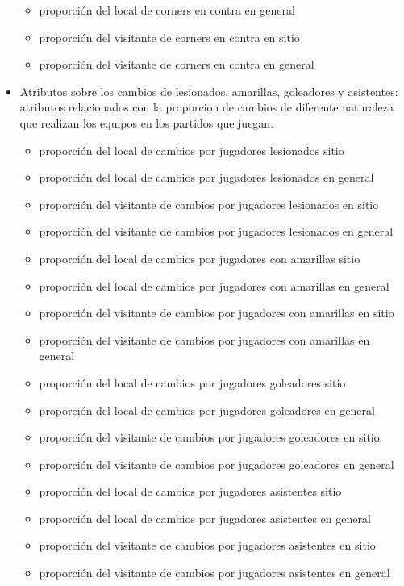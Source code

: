\begin{itemize}
\begin{itemize}
        \item proporción del local de corners en contra en general
        \item proporción del visitante de corners en contra en sitio
        \item proporción del visitante de corners en contra en general
    \end{itemize}
    \item Atributos sobre los cambios de lesionados, amarillas, goleadores y asistentes: atributos relacionados con la proporcion de cambios de diferente naturaleza que realizan los equipos en los partidos que juegan.
    \begin{itemize}
        \item proporción del local de cambios por jugadores lesionados sitio
        \item proporción del local de cambios por jugadores lesionados en general
        \item proporción del visitante de cambios por jugadores lesionados en sitio
        \item proporción del visitante de cambios por jugadores lesionados en general
        \item proporción del local de cambios por jugadores con amarillas sitio
        \item proporción del local de cambios por jugadores con amarillas en general
        \item proporción del visitante de cambios por jugadores con amarillas en sitio
        \item proporción del visitante de cambios por jugadores con amarillas en general
        \item proporción del local de cambios por jugadores goleadores sitio
        \item proporción del local de cambios por jugadores goleadores en general
        \item proporción del visitante de cambios por jugadores goleadores en sitio
        \item proporción del visitante de cambios por jugadores goleadores en general
        \item proporción del local de cambios por jugadores asistentes sitio
        \item proporción del local de cambios por jugadores asistentes en general
        \item proporción del visitante de cambios por jugadores asistentes en sitio
        \item proporción del visitante de cambios por jugadores asistentes en general

\end{itemize}
\end{itemize}

